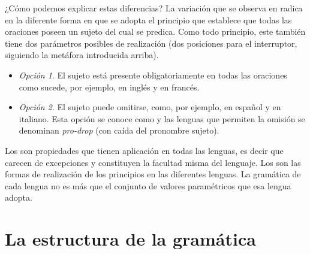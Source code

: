 ¿Cómo podemos explicar estas diferencias? La variación que se observa en
 radica en la diferente forma en que se adopta el
principio que establece que todas las oraciones poseen un sujeto del cual se
predica. Como todo principio, este también tiene dos parámetros posibles de
realización (dos posiciones para el interruptor, siguiendo la metáfora
introducida arriba).

\begin{itemize}
  \item \textit{Opción 1}. El sujeto está presente obligatoriamente en todas
        las oraciones como sucede, por ejemplo, en inglés y en francés.
  \item \textit{Opción 2}. El sujeto puede omitirse, como, por ejemplo, en
        español y en italiano. Esta opción se conoce como  y las lenguas que permiten la omisión se denominan
        \textit{pro-drop} (con caída del pronombre sujeto).
\end{itemize}

\begin{recuadro}
Los  son propiedades que tienen aplicación en todas las
lenguas, es decir que carecen de excepciones y constituyen la facultad misma
del lenguaje. Los  son las formas de realización de los
principios en las diferentes lenguas. La gramática de cada lengua no es más que
el conjunto de valores paramétricos que esa lengua adopta.
\end{recuadro}

\section{La estructura de la gramática}\label{sec:01-estructura}

